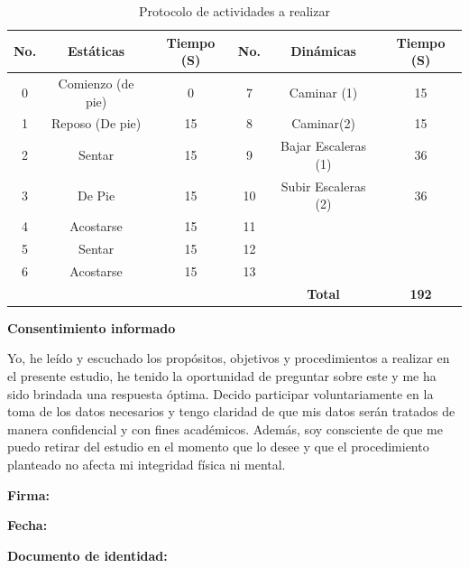 \documentclass[11pt]{report}
\begin{document}
\begin{table}[h!]
\begin{center}
\begin{tabular}{ |c|c|c|c|c|c| } 
\hline
\textbf{No.} & \textbf{Estáticas} & \textbf{Tiempo (S)} & \textbf{No.} & \textbf{Dinámicas} & \textbf{Tiempo (S)} \\
\hline
0 & Comienzo (de pie) & 0 & 7 & Caminar (1) & 15 \\ 
1&  Reposo (De pie) & 15 & 8 & Caminar(2) & 15\\ 
2&  Sentar & 15 & 9 & Bajar Escaleras (1) & 36\\ 
3&  De Pie & 15 & 10 & Subir Escaleras (2) & 36\\ 
4&  Acostarse & 15 & 11 &  & \\ 
5&  Sentar & 15 & 12 &  & \\ 
6&  Acostarse & 15 & 13 &  & \\ 
\hline
\hline
&   &  &  & \textbf{Total} & \textbf{192}\\ 
\hline
\end{tabular}
\caption{Protocolo de actividades a realizar}
\end{center}
\end{table}

\par
\medskip
\noindent
\textbf{Consentimiento informado}

\par
\medskip
\noindent
Yo,  \indent   \indent  \indent   \indent \indent   \indent  \indent   \indent  \indent   \indent  \indent   \indent he leído y escuchado los propósitos, objetivos y procedimientos a realizar en el presente estudio, he tenido la oportunidad de preguntar sobre este y me ha sido brindada una respuesta óptima. Decido participar voluntariamente en la toma de los datos necesarios y tengo claridad de que mis datos serán tratados de manera confidencial y con fines académicos. Además, soy consciente de que me puedo retirar del estudio en el momento que lo desee y que el procedimiento planteado no afecta mi integridad física ni mental. 

\par
\medskip
\medskip
\medskip
\noindent
\textbf{Firma: }

\par
\medskip
\noindent
\textbf{Fecha: } 

\par
\medskip
\noindent
\textbf{Documento de identidad: } 
\end{document}
